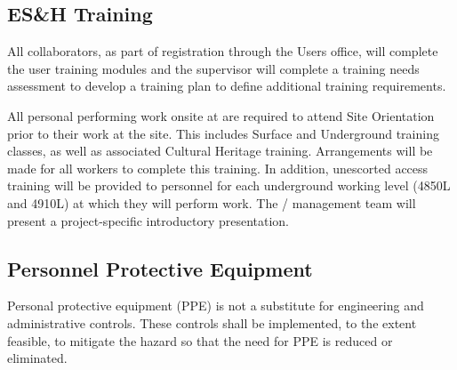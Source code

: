 \subsection{ES\&H Training}

All  collaborators, as part of registration through the \fnal Users office,
will complete the user  training modules and the supervisor
will complete a training needs assessment to develop a training plan
to define additional   training requirements.

\begin{comment}
All personal performing work onsite at \dword{surf} are required to
attend \dword{surf} \dword{esh} Site Orientation prior to performing
any work onsite.  The \dword{surf} Surface and Underground training
modules classes, including associated Cultural Heritage training, are
required to work on the site and arrangements will be made for all
workers to complete this training prior to beginning work. In
addition, unescorted access training will be provided to personnel for
each underground working level (4850L and 4910L) they will be required
to perform work.  The \dword{lbnf-dune} \dword{esh} management
team will present a project-specific introductory \dword{esh}
presentation.
\end{comment}
All personal performing work onsite at  are required to
attend   Site Orientation prior to their work at the site.  This includes  Surface and Underground training classes, as well as associated Cultural Heritage training. Arrangements will be made for all workers to complete this training. In
addition, unescorted access training will be provided to personnel for
each underground working level (4850L and 4910L) at which they will perform work.  The /  management
team will present a project-specific introductory 
presentation.

\subsection{Personnel Protective Equipment}

Personal protective equipment (PPE) is not a substitute for
engineering and administrative controls. These controls shall be
implemented, to the extent feasible, to mitigate the hazard so that
the need for PPE is reduced or eliminated.

